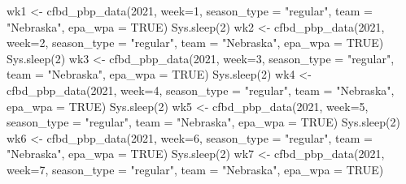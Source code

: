 \documentclass[
  letterpaper,
  DIV=11,
  numbers=noendperiod]{scrreprt}
\newenvironment{Shaded}{\begin{snugshade}}{\end{snugshade}}
\newcommand{\AttributeTok}[1]{\textcolor[rgb]{0.40,0.45,0.13}{#1}}
\newcommand{\ConstantTok}[1]{\textcolor[rgb]{0.56,0.35,0.01}{#1}}
\newcommand{\DecValTok}[1]{\textcolor[rgb]{0.68,0.00,0.00}{#1}}
\newcommand{\FunctionTok}[1]{\textcolor[rgb]{0.28,0.35,0.67}{#1}}
\newcommand{\NormalTok}[1]{\textcolor[rgb]{0.00,0.23,0.31}{#1}}
\newcommand{\OtherTok}[1]{\textcolor[rgb]{0.00,0.23,0.31}{#1}}
\newcommand{\StringTok}[1]{\textcolor[rgb]{0.13,0.47,0.30}{#1}}
\begin{document}
\begin{Shaded}
\begin{Highlighting}[]
\NormalTok{wk1 }\OtherTok{\textless{}{-}} \FunctionTok{cfbd\_pbp\_data}\NormalTok{(}\DecValTok{2021}\NormalTok{, }\AttributeTok{week=}\DecValTok{1}\NormalTok{, }\AttributeTok{season\_type =} \StringTok{"regular"}\NormalTok{, }\AttributeTok{team =} \StringTok{"Nebraska"}\NormalTok{, }\AttributeTok{epa\_wpa =} \ConstantTok{TRUE}\NormalTok{)}
\FunctionTok{Sys.sleep}\NormalTok{(}\DecValTok{2}\NormalTok{)}
\NormalTok{wk2 }\OtherTok{\textless{}{-}} \FunctionTok{cfbd\_pbp\_data}\NormalTok{(}\DecValTok{2021}\NormalTok{, }\AttributeTok{week=}\DecValTok{2}\NormalTok{, }\AttributeTok{season\_type =} \StringTok{"regular"}\NormalTok{, }\AttributeTok{team =} \StringTok{"Nebraska"}\NormalTok{, }\AttributeTok{epa\_wpa =} \ConstantTok{TRUE}\NormalTok{)}
\FunctionTok{Sys.sleep}\NormalTok{(}\DecValTok{2}\NormalTok{)}
\NormalTok{wk3 }\OtherTok{\textless{}{-}} \FunctionTok{cfbd\_pbp\_data}\NormalTok{(}\DecValTok{2021}\NormalTok{, }\AttributeTok{week=}\DecValTok{3}\NormalTok{, }\AttributeTok{season\_type =} \StringTok{"regular"}\NormalTok{, }\AttributeTok{team =} \StringTok{"Nebraska"}\NormalTok{, }\AttributeTok{epa\_wpa =} \ConstantTok{TRUE}\NormalTok{)}
\FunctionTok{Sys.sleep}\NormalTok{(}\DecValTok{2}\NormalTok{)}
\NormalTok{wk4 }\OtherTok{\textless{}{-}} \FunctionTok{cfbd\_pbp\_data}\NormalTok{(}\DecValTok{2021}\NormalTok{, }\AttributeTok{week=}\DecValTok{4}\NormalTok{, }\AttributeTok{season\_type =} \StringTok{"regular"}\NormalTok{, }\AttributeTok{team =} \StringTok{"Nebraska"}\NormalTok{, }\AttributeTok{epa\_wpa =} \ConstantTok{TRUE}\NormalTok{)}
\FunctionTok{Sys.sleep}\NormalTok{(}\DecValTok{2}\NormalTok{)}
\NormalTok{wk5 }\OtherTok{\textless{}{-}} \FunctionTok{cfbd\_pbp\_data}\NormalTok{(}\DecValTok{2021}\NormalTok{, }\AttributeTok{week=}\DecValTok{5}\NormalTok{, }\AttributeTok{season\_type =} \StringTok{"regular"}\NormalTok{, }\AttributeTok{team =} \StringTok{"Nebraska"}\NormalTok{, }\AttributeTok{epa\_wpa =} \ConstantTok{TRUE}\NormalTok{)}
\FunctionTok{Sys.sleep}\NormalTok{(}\DecValTok{2}\NormalTok{)}
\NormalTok{wk6 }\OtherTok{\textless{}{-}} \FunctionTok{cfbd\_pbp\_data}\NormalTok{(}\DecValTok{2021}\NormalTok{, }\AttributeTok{week=}\DecValTok{6}\NormalTok{, }\AttributeTok{season\_type =} \StringTok{"regular"}\NormalTok{, }\AttributeTok{team =} \StringTok{"Nebraska"}\NormalTok{, }\AttributeTok{epa\_wpa =} \ConstantTok{TRUE}\NormalTok{)}
\FunctionTok{Sys.sleep}\NormalTok{(}\DecValTok{2}\NormalTok{)}
\NormalTok{wk7 }\OtherTok{\textless{}{-}} \FunctionTok{cfbd\_pbp\_data}\NormalTok{(}\DecValTok{2021}\NormalTok{, }\AttributeTok{week=}\DecValTok{7}\NormalTok{, }\AttributeTok{season\_type =} \StringTok{"regular"}\NormalTok{, }\AttributeTok{team =} \StringTok{"Nebraska"}\NormalTok{, }\AttributeTok{epa\_wpa =} \ConstantTok{TRUE}\NormalTok{)}

\end{Highlighting}
\end{Shaded}
\end{document}
